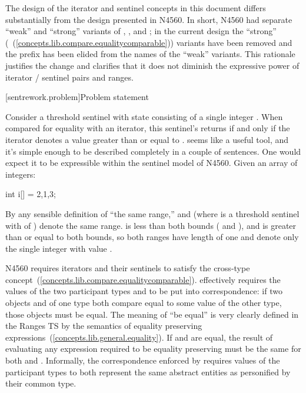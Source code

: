 
\pnum
The design of the iterator and sentinel concepts in this document differs
substantially from the design presented in N4560. In short, N4560 had separate
``weak'' and ``strong'' variants of , , and
; in the current design the ``strong''
(~(\ref{concepts.lib.compare.equalitycomparable})) variants have been removed and the 
prefix has been elided from the names of the ``weak'' variants. This rationale
justifies the change and clarifies that it does not diminish the expressive
power of iterator / sentinel pairs and ranges.

[sentrework.problem]{Problem statement}

\pnum
Consider a threshold sentinel  with state consisting of a single
integer . When compared for equality with an iterator, this
sentinel's \tcode{==} returns  if and only if the iterator denotes
a value greater than or equal to .  seems like a useful
tool, and it's simple enough to be described completely in a couple of
sentences. One would expect it to be expressible within the sentinel model of
N4560. Given an array of integers:
\begin{codeblock}
  int i[] = {2,1,3};
\end{codeblock}
By any sensible definition of ``the same range,''  and
 (where  is a threshold sentinel with
 of ) denote the same range.  is less
than both bounds ( and ), and  is greater
than or equal to both bounds, so both ranges have length of one and denote only
the single integer with value .

\pnum
N4560 requires iterators and their sentinels to satisfy the cross-type
 concept~(\ref{concepts.lib.compare.equalitycomparable}).
 effectively requires the values of the two
participant types  and  to be put into correspondence: if two
objects  and  of one type both compare equal to some value
of the other type, those objects must be equal. The meaning of ``be equal'' is
very clearly defined in the Ranges TS by the semantics of equality preserving
expressions~(\ref{concepts.lib.general.equality}). If  and 
are equal, the result of evaluating any expression required to be equality
preserving must be the same for both  and . Informally,
the correspondence enforced by  requires values of the
participant types to both represent the same abstract entities as personified by
their common type.

